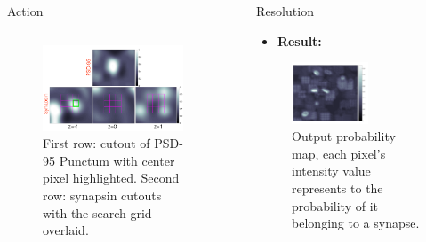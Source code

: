 \documentclass[final, table]{beamer}
\newlength{\sepwid}
\newlength{\onecolwid}
\newlength{\twocolwid}
\begin{document}
\begin{frame}[t]
\begin{columns}[t]
\begin{column}{\twocolwid}
\begin{block}{Action}
\begin{columns}[t]
\begin{column}{\onecolwid}
\begin{figure}[!h]
\centering
\includegraphics[width=1\textwidth]{figs/gridsearch}
\caption{First row: cutout of PSD-95 Punctum with center pixel highlighted. Second row: synapsin cutouts with the search grid overlaid.} 
\end{figure} 


\end{column}
\end{columns} 
\end{block}
\end{column} 

\begin{column}{\sepwid}\end{column}  %
\begin{column}{\onecolwid}



\begin{block}{Resolution} 
\begin{itemize} 
\item \textbf{Result:} 
\end{itemize}  

\begin{figure}[!h]
\centering
\includegraphics[width=0.6\textwidth]{figs/silane_output}
\caption{Output probability map, each pixel's intensity value represents to the probability of it belonging to a synapse. }
\end{figure}




\end{block}
\end{column}
\end{columns}
\end{frame}
\end{document}
